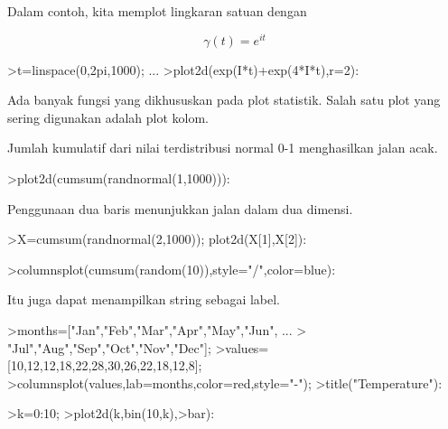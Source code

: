 \documentclass{article}
\begin{document}
\begin{eulernotebook}
\begin{eulercomment}
\begin{eulercomment}
\begin{eulercomment}
\begin{eulercomment}
\begin{eulercomment}
\begin{eulercomment}
\begin{eulercomment}
\begin{eulercomment}
\begin{eulercomment}
Dalam contoh, kita memplot lingkaran satuan dengan

\end{eulercomment}
\begin{eulerformula}
\[
\gamma(t) = e^{it}
\]
\end{eulerformula}
\begin{eulerprompt}
>t=linspace(0,2pi,1000); ...
>plot2d(exp(I*t)+exp(4*I*t),r=2):
\end{eulerprompt}
\begin{eulercomment}
Ada banyak fungsi yang dikhususkan pada plot statistik. Salah satu
plot yang sering digunakan adalah plot kolom.

Jumlah kumulatif dari nilai terdistribusi normal 0-1 menghasilkan
jalan acak.
\end{eulercomment}
\begin{eulerprompt}
>plot2d(cumsum(randnormal(1,1000))):
\end{eulerprompt}
\begin{eulercomment}
Penggunaan dua baris menunjukkan jalan dalam dua dimensi.
\end{eulercomment}
\begin{eulerprompt}
>X=cumsum(randnormal(2,1000)); plot2d(X[1],X[2]):
\end{eulerprompt}
\begin{eulerprompt}
>columnsplot(cumsum(random(10)),style="/",color=blue):
\end{eulerprompt}
\begin{eulercomment}
Itu juga dapat menampilkan string sebagai label.
\end{eulercomment}
\begin{eulerprompt}
>months=["Jan","Feb","Mar","Apr","May","Jun", ...
>  "Jul","Aug","Sep","Oct","Nov","Dec"];
>values=[10,12,12,18,22,28,30,26,22,18,12,8];
>columnsplot(values,lab=months,color=red,style="-");
>title("Temperature"):
\end{eulerprompt}
\begin{eulerprompt}
>k=0:10;
>plot2d(k,bin(10,k),>bar):
\end{eulerprompt}

\end{eulercomment}
\end{eulercomment}
\end{eulercomment}
\end{eulercomment}
\end{eulercomment}
\end{eulercomment}
\end{eulercomment}
\end{eulercomment}
\end{eulernotebook}
\end{document}
